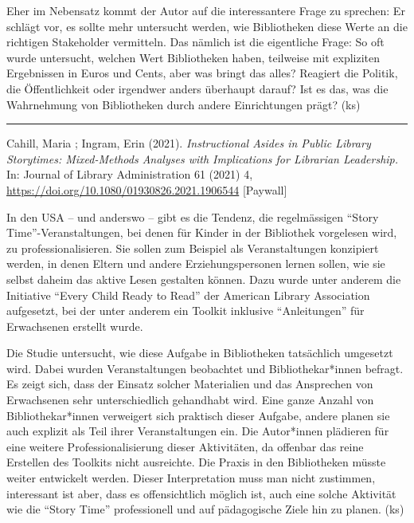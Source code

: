 \documentclass[a4paper,
fontsize=11pt,
oneside,
numbers=noperiodatend,
parskip=half-,
bibliography=totoc,
final
]{scrartcl}
\begin{document}
Eher im Nebensatz kommt der Autor auf die interessantere Frage zu
sprechen: Er schlägt vor, es sollte mehr untersucht werden, wie
Bibliotheken diese Werte an die richtigen Stakeholder vermitteln. Das
nämlich ist die eigentliche Frage: So oft wurde untersucht, welchen Wert
Bibliotheken haben, teilweise mit expliziten Ergebnissen in Euros und
Cents, aber was bringt das alles? Reagiert die Politik, die
Öffentlichkeit oder irgendwer anders überhaupt darauf? Ist es das, was
die Wahrnehmung von Bibliotheken durch andere Einrichtungen prägt? (ks)

 \begin{center}\rule{0.5\linewidth}{0.5pt}\end{center}

Cahill, Maria ; Ingram, Erin (2021). \emph{Instructional Asides in
Public Library Storytimes: Mixed-Methods Analyses with Implications for
Librarian Leadership.} In: Journal of Library Administration 61 (2021)
4, \url{https://doi.org/10.1080/01930826.2021.1906544} {[}Paywall{]}

In den USA -- und anderswo -- gibt es die Tendenz, die regelmässigen
\enquote{Story Time}-Veranstaltungen, bei denen für Kinder in der
Bibliothek vorgelesen wird, zu professionalisieren. Sie sollen zum
Beispiel als Veranstaltungen konzipiert werden, in denen Eltern und
andere Erziehungspersonen lernen sollen, wie sie selbst daheim das
aktive Lesen gestalten können. Dazu wurde unter anderem die Initiative
\enquote{Every Child Ready to Read} der American Library Association
aufgesetzt, bei der unter anderem ein Toolkit inklusive
\enquote{Anleitungen} für Erwachsenen erstellt wurde.

Die Studie untersucht, wie diese Aufgabe in Bibliotheken tatsächlich
umgesetzt wird. Dabei wurden Veranstaltungen beobachtet und
Bibliothekar*innen befragt. Es zeigt sich, dass der Einsatz solcher
Materialien und das Ansprechen von Erwachsenen sehr unterschiedlich
gehandhabt wird. Eine ganze Anzahl von Bibliothekar*innen verweigert
sich praktisch dieser Aufgabe, andere planen sie auch explizit als Teil
ihrer Veranstaltungen ein. Die Autor*innen plädieren für eine weitere
Professionalisierung dieser Aktivitäten, da offenbar das reine Erstellen
des Toolkits nicht ausreichte. Die Praxis in den Bibliotheken müsste
weiter entwickelt werden. Dieser Interpretation muss man nicht
zustimmen, interessant ist aber, dass es offensichtlich möglich ist,
auch eine solche Aktivität wie die \enquote{Story Time} professionell
und auf pädagogische Ziele hin zu planen. (ks)
\end{document}

